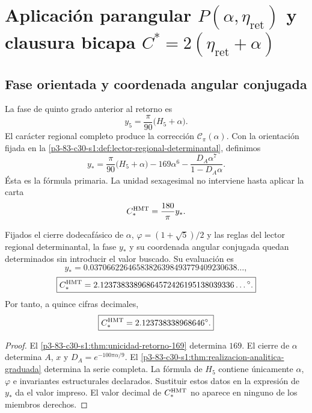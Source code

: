 \section{Aplicación parangular \texorpdfstring{\(P(\alpha,\eta_{\mathrm{ret}})\)}{P(alpha,eta_ret)} y clausura bicapa \texorpdfstring{\(C^*=2(\eta_{\mathrm{ret}}+\alpha)\)}{C*=2(eta_ret+alpha)}}
\label{sec:s102:c38:4}

\subsection{Fase orientada y coordenada angular conjugada}
\label{sec:s102:c38:4:1}


La fase de quinto grado anterior al retorno es
\[
y_5=\frac\pi{90}\bigl(H_5+\alpha\bigr).
\]
El carácter regional completo produce la corrección
\(\mathscr C_\pi(\alpha)\). Con la orientación fijada en la
\cref{p3-83-c30-s1:def:lector-regional-determinantal}, definimos
\[
\boxed{
y_*=\frac\pi{90}\bigl(H_5+\alpha\bigr)
-169\alpha^6
-\frac{D_A\alpha^7}{1-D_A\alpha}.}
\]
Ésta es la fórmula primaria. La unidad sexagesimal no interviene hasta aplicar la carta
\[
C_*^{\rm HMT}=\frac{180}{\pi}y_*.
\]

\begin{theorem}
\label{p3-83-c30-s1:thm:contraangulo-regional}
Fijados el cierre dodecafásico de \(\alpha\),
\(\varphi=(1+\sqrt5)/2\) y las reglas del lector regional determinantal, la
fase \(y_*\) y su coordenada angular conjugada quedan determinados sin introducir el valor
buscado. Su evaluación es
\[
\boxed{
y_*=0.03706622646583826398493779409230638\ldots,}
\]
\[
\boxed{
C_*^{\rm HMT}
=2.12373833896864572426195138039336\ldots{}^\circ.}
\]
Por tanto, a quince cifras decimales,
\[
\boxed{C_*^{\rm HMT}=2.123738338968646^\circ.}
\]
\end{theorem}

\begin{proof}
El \cref{p3-83-c30-s1:thm:unicidad-retorno-169} determina \(169\). El cierre de
\(\alpha\) determina \(A\), \(x\) y
\(D_A=e^{-100\pi\alpha/9}\). El \cref{p3-83-c30-s1:thm:realizacion-analitica-graduada}
determina la serie completa. La fórmula de \(H_5\) contiene únicamente
\(\alpha\), \(\varphi\) e invariantes estructurales declarados. Sustituir
estos datos en la expresión de \(y_*\) da el valor impreso. El valor decimal
de \(C_*^{\rm HMT}\) no aparece en ninguno de los miembros derechos.
\end{proof}

